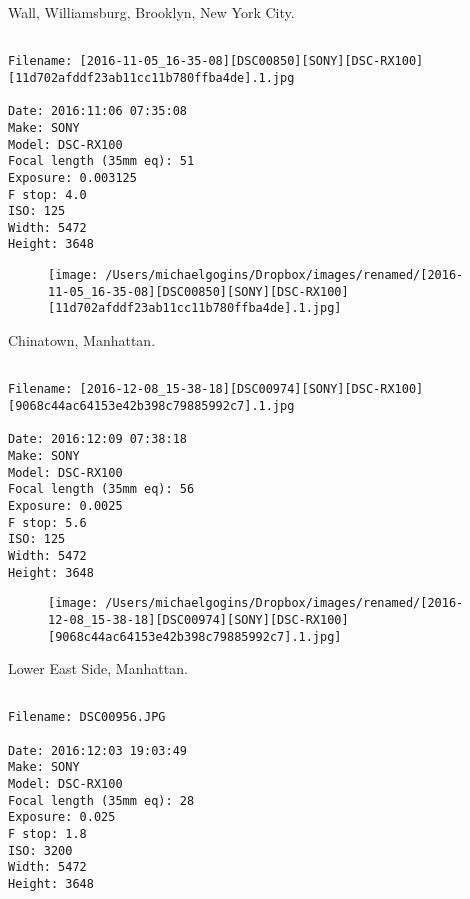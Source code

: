 \clearpage
\onecolumn
\noindent Wall, Williamsburg, Brooklyn, New York City.
\noindent
\begin{lstlisting}

Filename: [2016-11-05_16-35-08][DSC00850][SONY][DSC-RX100][11d702afddf23ab11cc11b780ffba4de].1.jpg

Date: 2016:11:06 07:35:08
Make: SONY
Model: DSC-RX100
Focal length (35mm eq): 51
Exposure: 0.003125
F stop: 4.0
ISO: 125
Width: 5472
Height: 3648
\end{lstlisting}
\clearpage

\begin{figure}
\texttt{[image: /Users/michaelgogins/Dropbox/images/renamed/[2016-11-05\_16-35-08][DSC00850][SONY][DSC-RX100][11d702afddf23ab11cc11b780ffba4de].1.jpg]}
\end{figure}
    
\clearpage
\onecolumn
\noindent Chinatown, Manhattan.
\noindent
\begin{lstlisting}

Filename: [2016-12-08_15-38-18][DSC00974][SONY][DSC-RX100][9068c44ac64153e42b398c79885992c7].1.jpg

Date: 2016:12:09 07:38:18
Make: SONY
Model: DSC-RX100
Focal length (35mm eq): 56
Exposure: 0.0025
F stop: 5.6
ISO: 125
Width: 5472
Height: 3648
\end{lstlisting}
\clearpage

\begin{figure}
\texttt{[image: /Users/michaelgogins/Dropbox/images/renamed/[2016-12-08\_15-38-18][DSC00974][SONY][DSC-RX100][9068c44ac64153e42b398c79885992c7].1.jpg]}
\end{figure}
    
\clearpage
\onecolumn
\noindent Lower East Side, Manhattan.
\noindent
\begin{lstlisting}

Filename: DSC00956.JPG

Date: 2016:12:03 19:03:49
Make: SONY
Model: DSC-RX100
Focal length (35mm eq): 28
Exposure: 0.025
F stop: 1.8
ISO: 3200
Width: 5472
Height: 3648
\end{lstlisting}
\clearpage

